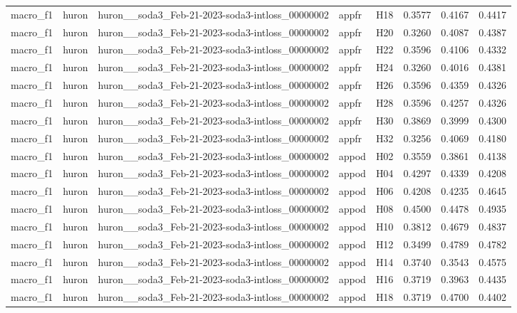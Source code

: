 \begin{table}[tbp]
\begin{tabular}{lllllrrr}
macro\_f1 & huron & huron\_\_soda3\_Feb-21-2023-soda3-intloss\_00000002 & appfr & H18 & 0.3577 & 0.4167 & 0.4417 \\
macro\_f1 & huron & huron\_\_soda3\_Feb-21-2023-soda3-intloss\_00000002 & appfr & H20 & 0.3260 & 0.4087 & 0.4387 \\
macro\_f1 & huron & huron\_\_soda3\_Feb-21-2023-soda3-intloss\_00000002 & appfr & H22 & 0.3596 & 0.4106 & 0.4332 \\
macro\_f1 & huron & huron\_\_soda3\_Feb-21-2023-soda3-intloss\_00000002 & appfr & H24 & 0.3260 & 0.4016 & 0.4381 \\
macro\_f1 & huron & huron\_\_soda3\_Feb-21-2023-soda3-intloss\_00000002 & appfr & H26 & 0.3596 & 0.4359 & 0.4326 \\
macro\_f1 & huron & huron\_\_soda3\_Feb-21-2023-soda3-intloss\_00000002 & appfr & H28 & 0.3596 & 0.4257 & 0.4326 \\
macro\_f1 & huron & huron\_\_soda3\_Feb-21-2023-soda3-intloss\_00000002 & appfr & H30 & 0.3869 & 0.3999 & 0.4300 \\
macro\_f1 & huron & huron\_\_soda3\_Feb-21-2023-soda3-intloss\_00000002 & appfr & H32 & 0.3256 & 0.4069 & 0.4180 \\
macro\_f1 & huron & huron\_\_soda3\_Feb-21-2023-soda3-intloss\_00000002 & appod & H02 & 0.3559 & 0.3861 & 0.4138 \\
macro\_f1 & huron & huron\_\_soda3\_Feb-21-2023-soda3-intloss\_00000002 & appod & H04 & 0.4297 & 0.4339 & 0.4208 \\
macro\_f1 & huron & huron\_\_soda3\_Feb-21-2023-soda3-intloss\_00000002 & appod & H06 & 0.4208 & 0.4235 & 0.4645 \\
macro\_f1 & huron & huron\_\_soda3\_Feb-21-2023-soda3-intloss\_00000002 & appod & H08 & 0.4500 & 0.4478 & 0.4935 \\
macro\_f1 & huron & huron\_\_soda3\_Feb-21-2023-soda3-intloss\_00000002 & appod & H10 & 0.3812 & 0.4679 & 0.4837 \\
macro\_f1 & huron & huron\_\_soda3\_Feb-21-2023-soda3-intloss\_00000002 & appod & H12 & 0.3499 & 0.4789 & 0.4782 \\
macro\_f1 & huron & huron\_\_soda3\_Feb-21-2023-soda3-intloss\_00000002 & appod & H14 & 0.3740 & 0.3543 & 0.4575 \\
macro\_f1 & huron & huron\_\_soda3\_Feb-21-2023-soda3-intloss\_00000002 & appod & H16 & 0.3719 & 0.3963 & 0.4435 \\
macro\_f1 & huron & huron\_\_soda3\_Feb-21-2023-soda3-intloss\_00000002 & appod & H18 & 0.3719 & 0.4700 & 0.4402 \\

\end{tabular}
\end{table}
